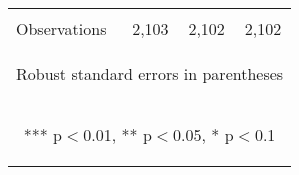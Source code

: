 \begin{center}
\begin{tabular}{lccc}
\vspace{4pt} & \begin{footnotesize}\end{footnotesize} & \begin{footnotesize}\end{footnotesize} & \begin{footnotesize}\end{footnotesize} \\
 Observations & 2,103 & 2,102 & 2,102 \\ \hline
\multicolumn{4}{c}{\begin{footnotesize} Robust standard errors in parentheses\end{footnotesize}} \\
\multicolumn{4}{c}{\begin{footnotesize} *** p$<$0.01, ** p$<$0.05, * p$<$0.1\end{footnotesize}} \\
\end{tabular}
\end{center}
